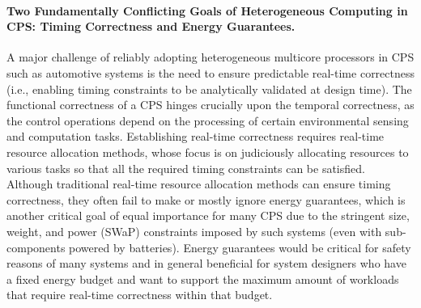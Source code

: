 
\vspace{-4mm}
\paragraph{Two Fundamentally Conflicting Goals of Heterogeneous Computing in CPS: Timing Correctness and Energy Guarantees.} 
A major challenge of reliably adopting heterogeneous multicore processors in CPS such as automotive systems is the need to ensure predictable real-time correctness (i.e., enabling timing constraints to be analytically validated at design time).  %
The functional correctness of a CPS hinges crucially upon the temporal correctness, as the control operations depend on the processing of certain environmental sensing and computation tasks. Establishing real-time correctness requires real-time resource allocation methods, whose focus is on judiciously allocating resources to various tasks so that all the required timing constraints can be satisfied. Although traditional real-time resource allocation methods can ensure timing correctness, they often fail to make or mostly ignore energy guarantees, which is another critical goal of equal importance for many CPS due to the stringent  size, weight, and power (SWaP) constraints imposed by such systems (even with sub-components powered by batteries). Energy guarantees would be critical for safety reasons of many systems and in general beneficial for system designers who have a fixed energy budget and want to support the maximum amount of workloads that require real-time correctness within that budget. 

